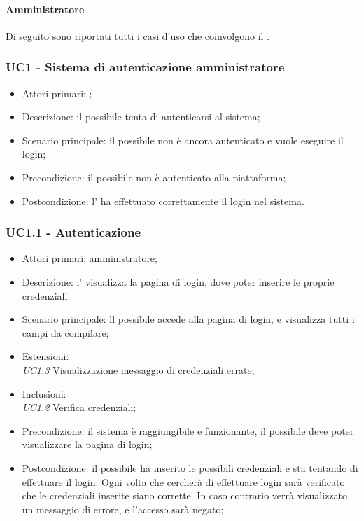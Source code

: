\documentclass[../analisi-dei-requisiti]{subfiles}
\begin{document}
\paragraph{Amministratore}
\label{par:amministratore}
Di seguito sono riportati tutti i casi d'uso che coinvolgono il  .


\subsubsection{UC1 - Sistema di autenticazione amministratore}
\label{subsub:UC1}

\begin{itemize}
\item Attori primari: ;
\item Descrizione: il possibile  tenta di autenticarsi al sistema;
\item Scenario principale: il possibile  non è ancora autenticato e vuole eseguire il login;
\item Precondizione: il possibile  non è autenticato alla piattaforma;
\item Postcondizione: l' ha effettuato correttamente il login nel sistema.

\end{itemize}
\subsubsection{UC1.1 - Autenticazione}
\label{subsub:UC1.1}

\begin{itemize}
\item Attori primari: amministratore;
\item Descrizione: l' visualizza la pagina di login, dove poter inserire le proprie credenziali. 
\item Scenario principale: ll possibile  accede alla pagina di login, e visualizza tutti i campi da compilare;
\item Estensioni: \\\emph{UC1.3} Visualizzazione messaggio di credenziali errate;
\item Inclusioni: \\\emph{UC1.2} Verifica credenziali;
\item Precondizione: il sistema è raggiungibile e funzionante, il possibile  deve poter visualizzare la pagina di login;
\item Postcondizione: il possibile  ha inserito le possibili credenziali e sta tentando di effettuare il login. Ogni volta che cercherà di effettuare
login sarà verificato che le credenziali inserite siano corrette. In caso contrario verrà visualizzato un messaggio di errore, e l'accesso sarà negato;

\end{itemize}
\end{document}
